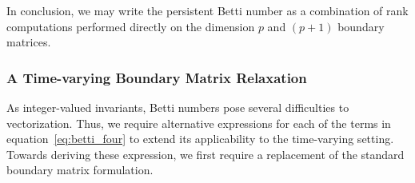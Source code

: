 \documentclass[10pt]{article}
\begin{document}
 In conclusion, we may write the persistent Betti number as a combination of rank computations performed directly on the dimension $p$ and $(p+1)$ boundary matrices. 


\subsubsection*{A Time-varying Boundary Matrix Relaxation}
As integer-valued invariants, Betti numbers pose several difficulties to vectorization. 
Thus, we require alternative expressions for each of the terms in equation~\eqref{eq:betti_four} to extend its applicability to the time-varying setting. Towards deriving these expression, we first require a replacement of the standard boundary matrix formulation. 
\end{document}
